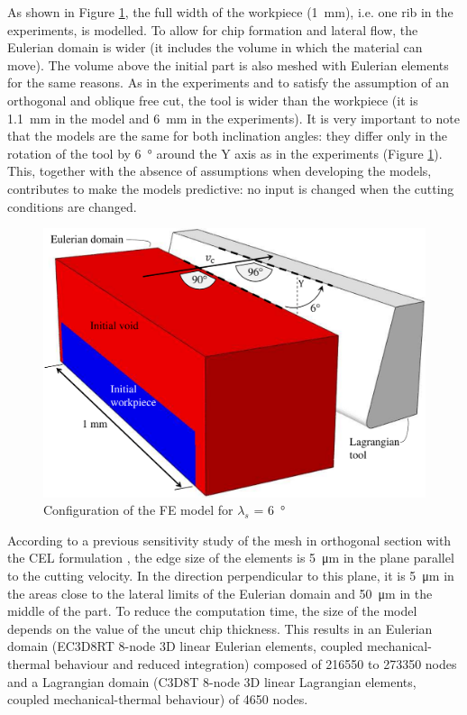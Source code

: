 \documentclass[preprint,12pt,times]{elsarticle}
\begin{document}
As shown in Figure \ref{fig:FEConfig}, the full width of the workpiece (\qty{1}{\mm}), i.e. one rib in the experiments, is modelled. To allow for chip formation and lateral flow, the Eulerian domain is wider (it includes the volume in which the material can move). The volume above the initial part is also meshed with Eulerian elements for the same reasons. As in the experiments and to satisfy the assumption of an orthogonal and oblique free cut, the tool is wider than the workpiece (it is \qty{1.1}{\mm} in the model and \qty{6}{\mm} in the experiments). It is very important to note that the models are the same for both inclination angles: they differ only in the rotation of the tool by \qty{6}{\degree} around the Y axis as in the experiments (Figure \ref{fig:FEConfig}). This, together with the absence of assumptions when developing the models, contributes to make the models predictive: no input is changed when the cutting conditions are changed.

\begin{figure}[!h]
\centering
\includegraphics[width = 140 mm]{Figures/FEConfig}
\caption{Configuration of the FE model for $\lambda_s$ = \qty{6}{\degree}}
\label{fig:FEConfig}
\end{figure}

According to a previous sensitivity study of the mesh in orthogonal section with the CEL formulation \cite{ducobu_Finite_2017}, the edge size of the elements is \qty{5}{\um} in the plane parallel to the cutting velocity. In the direction perpendicular to this plane, it is \qty{5}{\um} in the areas close to the lateral limits of the Eulerian domain and \qty{50}{\um} in the middle of the part. To reduce the computation time, the size of the model depends on the value of the uncut chip thickness. This results in an Eulerian domain (EC3D8RT 8-node 3D linear Eulerian elements, coupled mechanical-thermal behaviour and reduced integration) composed of \num{216550} to \num{273350} nodes and a Lagrangian domain (C3D8T 8-node 3D linear Lagrangian elements, coupled mechanical-thermal behaviour) of \num{4650} nodes.
\end{document}
